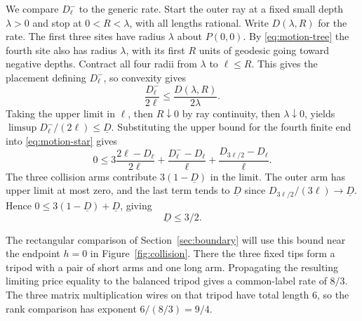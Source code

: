 We compare \(D_\ell^-\) to the generic rate. Start the outer ray
at a fixed small depth \(\lambda>0\) and stop at \(0<R<\lambda\),
with all lengths rational. Write \(D(\lambda,R)\) for the rate.
The first three sites have radius \(\lambda\) about \(P(0,0)\).
By \eqref{eq:motion-tree} the fourth site also has radius \(\lambda\),
with its first \(R\) units of geodesic going toward negative depths.
Contract all four radii from \(\lambda\) to \(\ell\le R\).
This gives the placement defining \(D_\ell^-\), so convexity gives
\[
   \frac{D_\ell^-}{2\ell}\le\frac{D(\lambda,R)}{2\lambda}.
\]
Taking the upper limit in \(\ell\), then \(R\downarrow0\) by ray
continuity, then \(\lambda\downarrow0\), yields
\(\limsup D_\ell^-/(2\ell)\le \underline D\). Substituting the upper bound for
the fourth finite end into \eqref{eq:motion-star} gives
\begin{equation}\label{eq:motion-fourstar}
 0\le 3\frac{2\ell-D_\ell}{2\ell}
      +\frac{D_\ell^--D_\ell}{\ell}
      +\frac{D_{3\ell/2}-D_\ell}{\ell}.
\end{equation}
The three collision arms contribute \(3(1-\underline D)\) in the limit. The outer
arm has upper limit at most zero, and the last term tends to \(\underline D\) since
\(D_{3\ell/2}/(3\ell)\to \underline D\). Hence \(0\le 3(1-\underline D)+\underline D\), giving
\begin{equation}\label{eq:motion-upper}
                        \underline D\le 3/2 .
\end{equation}

The rectangular comparison of Section~\ref{sec:boundary} will use this
bound near the endpoint \(h=0\) in Figure~\ref{fig:collision}. There
the three fixed tips form a tripod with a pair of short arms and one
long arm. Propagating the resulting limiting price equality to the
balanced tripod gives a common-label rate of \(8/3\). The three
matrix multiplication wires on that tripod have total length \(6\),
so the rank comparison has exponent \(6/(8/3)=9/4\).
